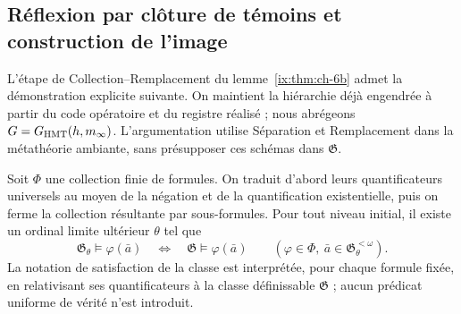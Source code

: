 \subsection{Réflexion par clôture de témoins et construction de l'image}
\label{empalme:reflexion-testigos}
L'étape de Collection--Remplacement du lemme~\ref{ix:thm:ch-6b} admet la
démonstration explicite suivante. On maintient la hiérarchie déjà engendrée à partir du
code opératoire et du registre réalisé ; nous abrégeons
\(\mathfrak G=\mathfrak G_{\rm HMT}(h,m_\infty)\).
L'argumentation utilise Séparation et Remplacement dans la métathéorie ambiante,
sans présupposer ces schémas dans \(\mathfrak G\).

Soit \(\Phi\) une collection finie de formules. On traduit d'abord leurs quantificateurs universels au moyen de la négation et de la quantification existentielle, puis on ferme la collection résultante par sous-formules. Pour tout niveau initial, il existe un ordinal limite ultérieur \(\theta\) tel que
\[
 \mathfrak G_\theta\models\varphi(\bar a)
 \quad\Longleftrightarrow\quad
 \mathfrak G\models\varphi(\bar a)
 \qquad
 (\varphi\in\Phi,\ \bar a\in\mathfrak G_\theta^{<\omega}).
\]
La notation de satisfaction de la classe est interprétée, pour chaque formule fixée, en relativisant ses quantificateurs à la classe définissable \(\mathfrak G\) ; aucun prédicat uniforme de vérité n'est introduit.

